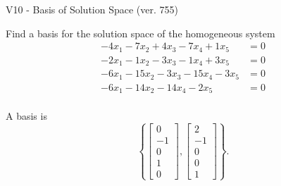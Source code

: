 \begin{exercise}
  \begin{exerciseTitle}V10 - Basis of Solution Space (ver. 755)\end{exerciseTitle}
  \begin{exerciseStatement}
    Find a basis for the solution space of the homogeneous system 
\begin{align*}
 -4 x_ 1 -7 x_ 2 + 4 x_ 3 -7 x_ 4 + 1 x_ 5 &= 0  \\ 
  -2 x_ 1 -1 x_ 2 -3 x_ 3 -1 x_ 4 + 3 x_ 5 &= 0  \\ 
  -6 x_ 1 -15 x_ 2 -3 x_ 3 -15 x_ 4 -3 x_ 5 &= 0  \\ 
  -6 x_ 1 -14 x_ 2 -14 x_ 4 -2 x_ 5 &= 0  \\ 
 \end{align*}


 
  \end{exerciseStatement}

  \begin{exerciseAnswer}
   A basis is   
\[\left\{\left[\begin{array}{c}
0 \\
-1 \\
0 \\
1 \\
0
\end{array}\right] , \left[\begin{array}{c}
2 \\
-1 \\
0 \\
0 \\
1
\end{array}\right]\right\}.\]

  


  \end{exerciseAnswer}
\end{exercise}
